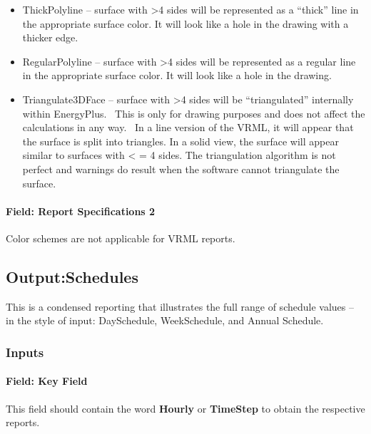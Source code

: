 \begin{itemize}
\item
  ThickPolyline -- surface with \textgreater{}4 sides will be represented as a ``thick'' line in the appropriate surface color. It will look like a hole in the drawing with a thicker edge.
\item
  RegularPolyline -- surface with \textgreater{}4 sides will be represented as a regular line in the appropriate surface color. It will look like a hole in the drawing.
\item
  Triangulate3DFace -- surface with \textgreater{}4 sides will be ``triangulated'' internally within EnergyPlus.~ This is only for drawing purposes and does not affect the calculations in any way.~ In a line version of the VRML, it will appear that the surface is split into triangles. In a solid view, the surface will appear similar to surfaces with \textless{} = 4 sides. The triangulation algorithm is not perfect and warnings do result when the software cannot triangulate the surface.
\end{itemize}

\paragraph{Field: Report Specifications 2}\label{field-report-specifications-2-1}

Color schemes are not applicable for VRML reports.

\subsection{Output:Schedules}\label{outputschedules}

This is a condensed reporting that illustrates the full range of schedule values -- in the style of input: DaySchedule, WeekSchedule, and Annual Schedule.

\subsubsection{Inputs}\label{inputs-2-034}

\paragraph{Field: Key Field}\label{field-key-field-1}

This field should contain the word \textbf{Hourly} or \textbf{TimeStep} to obtain the respective reports.

